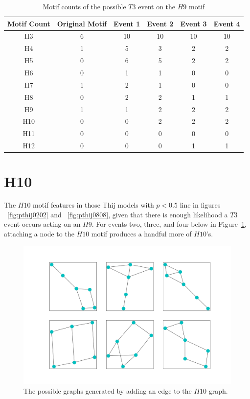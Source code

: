 \begin{table}
    \centering
    \begin{tabular}{||c c c c c c||} 
    \hline
    Motif Count & Original Motif & Event 1 & Event 2 & Event 3 & Event 4 \\ [0.5ex] 
    \hline\hline
    H3 & 6 & 10 & 10 & 10 & 10\\ 
    \hline
    H4 & 1 & 5 & 3 & 2 & 2 \\
    \hline
    H5 & 0 & 6 & 5 & 2 & 2 \\
    \hline
    H6 & 0 & 1 & 1 & 0 & 0 \\
    \hline
    H7 & 1 & 2 & 1 & 0 & 0 \\
    \hline
    H8 & 0 & 2 & 2 & 1 & 1\\
    \hline
    H9 & 1 & 1 & 2 & 2 & 2\\
    \hline
    H10 & 0 & 0 & 2 & 2 & 2\\
    \hline
    H11 & 0 & 0 & 0 & 0 & 0\\
    \hline
    H12 & 0 & 0 & 0 & 1 & 1\\
    \hline
   \end{tabular}
   \caption{Motif counts of the possible $T3$ event on the $H9$ motif}
   \label{table:18}
\end{table}

\section{H10}
The $H10$ motif features in those Thij models with $p<0.5$ line in figures ~\ref{fig:pthij0202} and
~\ref{fig:pthij0808}, given
that there is enough likelihood a $T3$ event occurs acting on an $H9$. For events two, three, and four below
in Figure~\ref{fig:H10T3}, attaching a node to the $H10$ motif produces a handful more of $H10$'s.


\begin{figure}
    \includegraphics[width=12cm]{Images/H10_T3_evolution.png}
    \centering
    \caption{The possible graphs generated by adding an edge to the $H10$ graph.}
    \label{fig:H10T3}
\end{figure}

